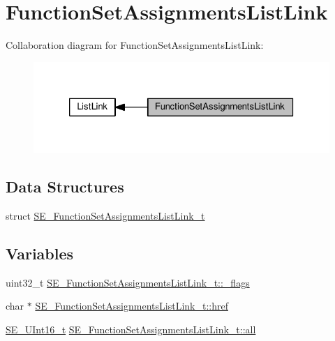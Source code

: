 \hypertarget{group__FunctionSetAssignmentsListLink}{}\section{Function\+Set\+Assignments\+List\+Link}
\label{group__FunctionSetAssignmentsListLink}
Collaboration diagram for Function\+Set\+Assignments\+List\+Link\+:\nopagebreak
\begin{figure}[H]
\begin{center}
\leavevmode
\includegraphics[width=326pt]{group__FunctionSetAssignmentsListLink}
\end{center}
\end{figure}
\subsection*{Data Structures}
\begin{DoxyCompactItemize}
\item 
struct \hyperlink{structSE__FunctionSetAssignmentsListLink__t}{S\+E\+\_\+\+Function\+Set\+Assignments\+List\+Link\+\_\+t}
\end{DoxyCompactItemize}
\subsection*{Variables}
\begin{DoxyCompactItemize}
\item 
uint32\+\_\+t \hyperlink{group__FunctionSetAssignmentsListLink_ga83c38e7f0cf85bdeca600fa281b2e9b6}{S\+E\+\_\+\+Function\+Set\+Assignments\+List\+Link\+\_\+t\+::\+\_\+flags}
\item 
char $\ast$ \hyperlink{group__FunctionSetAssignmentsListLink_ga3036f6fd9dadbff2ae4835682285dc6d}{S\+E\+\_\+\+Function\+Set\+Assignments\+List\+Link\+\_\+t\+::href}
\item 
\hyperlink{group__UInt16_gac68d541f189538bfd30cfaa712d20d29}{S\+E\+\_\+\+U\+Int16\+\_\+t} \hyperlink{group__FunctionSetAssignmentsListLink_ga1d29d4204c052e0aef55b98d374fc408}{S\+E\+\_\+\+Function\+Set\+Assignments\+List\+Link\+\_\+t\+::all}
\end{DoxyCompactItemize}


